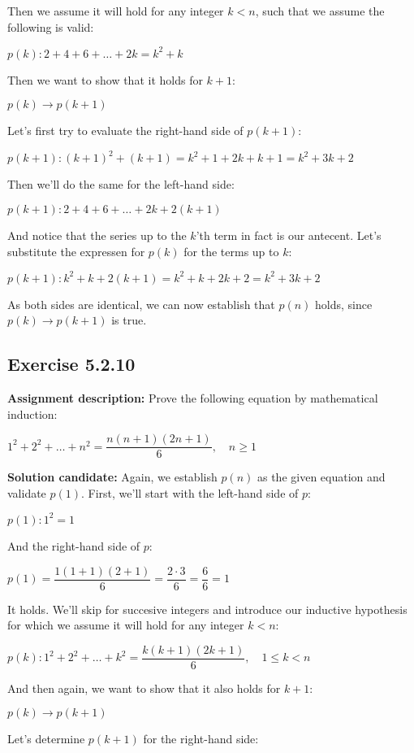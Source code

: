 \documentclass{report}
\newcommand{\cent}[1]{\begin{center}#1\end{center}}
\newcommand{\assignmentDescription}{\textbf{Assignment description: }}
\newcommand{\solution}{\textbf{Solution candidate: }}
\newcommand{\QED}{\boxed{}}
\newcommand{\Exercise}[1]{\subsection{Exercise #1}}
\begin{document}
	Then we assume it will hold for any integer $k < n$, such that we assume the following is valid:
	
	\cent{$p(k) : 2 + 4 +6 + \dots + 2k = k^2+k$}
	
	Then we want to show that it holds for $k+1$:
	
	\cent{$p(k) \to p(k+1)$}
	
	Let's first try to evaluate the right-hand side of $p(k+1)$:
	
	\cent{$p(k+1) : (k+1)^2 + (k+1) = k^2+1+2k + k+1 = k^2 +3k +2$}
	
	Then we'll do the same for the left-hand side:
	
	\cent{$p(k+1) : 2+ 4 + 6 + \dots + 2k + 2(k+1) $}
	
	And notice that the series up to the $k$'th term in fact is our antecent.  Let's substitute the expressen for $p(k)$ for the terms up to $k$:
	
	\cent{$p(k+1) : k^2+k + 2(k+1) = k^2+k+2k+2 = k^2+3k +2 $}
	
	As both sides are identical, we can now establish that $p(n)$ holds, since $p(k) \to p(k+1)$ is true.\\
	
	\QED
 		
 	\Exercise{5.2.10}
 	
 	\assignmentDescription
 	Prove the following equation by mathematical induction:
 	
 	\cent{$1^2 + 2^2 + \dots + n^2 = \dfrac{n(n+1)(2n+1)}{6}, \quad n \geq 1$}
 	
 	\solution
 	Again, we establish $p(n)$ as the given equation and validate $p(1)$. First, we'll start with the left-hand side of $p$:
 	
 	\cent{$p(1) : 1^2 = 1$}
 	
 	And the right-hand side of $p$:
 	
 	\cent{$p(1) = \dfrac{1(1+1)(2+1)}{6} = \dfrac{2 \cdot 3}{6} = \dfrac{6}{6} = 1 $}
 	
 	It holds. We'll skip for succesive integers and introduce our inductive hypothesis for which we assume it will hold for any integer $k<n$:
 	
 	\cent{$p(k) :  1^2 + 2^2 + \dots + k^2 = \dfrac{k(k+1)(2k+1)}{6}, \quad 1 \leq k < n $}
 	
 	And then again, we want to show that it also holds for $k+1$:
 	
 	\cent{$p(k) \to p(k+1)$}
 	
 	Let's determine $p(k+1)$ for the right-hand side:
 	
\end{document}
